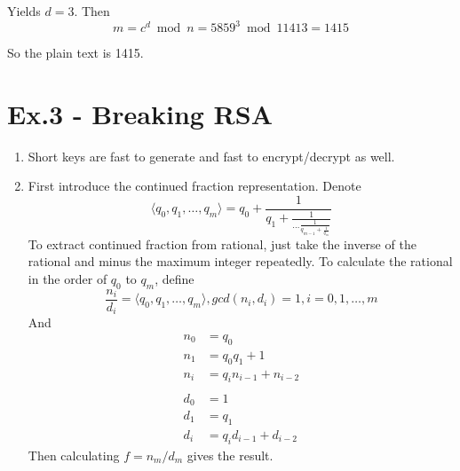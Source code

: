 \documentclass[12pt]{article}
\begin{document}
	Yields $d=3$. Then
	$$m=c^{d}\bmod n=5859^3 \bmod 11413=1415$$

	So the plain text is 1415.

\section*{Ex.3 - Breaking RSA}

	\begin{enumerate}
		\item
			Short keys are fast to generate and fast to encrypt/decrypt as well.
		\item
			First introduce the continued fraction representation. Denote
			$$\langle q_0,q_1,\ldots,q_m\rangle=q_0+\frac{1}{q_1+\frac{1}{\ldots\frac{1}{q_{m-1}+\frac{1}{q_m}}}}$$
			To extract continued fraction from rational, just take the inverse of the rational and minus the maximum integer repeatedly. To calculate the rational in the order of $q_0$ to $q_m$, define
			$$\frac{n_i}{d_i}=\langle q_0,q_1,\ldots,q_m\rangle,gcd(n_i,d_i)=1,i=0,1,\ldots,m$$
			And
			\begin{align*}
				n_0&=q_0\\
				n_1&=q_0q_1+1\\
				n_i&=q_in_{i-1}+n_{i-2}\\\\
				d_0&=1\\
				d_1&=q_1\\
				d_i&=q_id_{i-1}+d_{i-2}
			\end{align*}
			Then calculating $f=n_m/d_m$ gives the result.


\end{enumerate}
\end{document}
